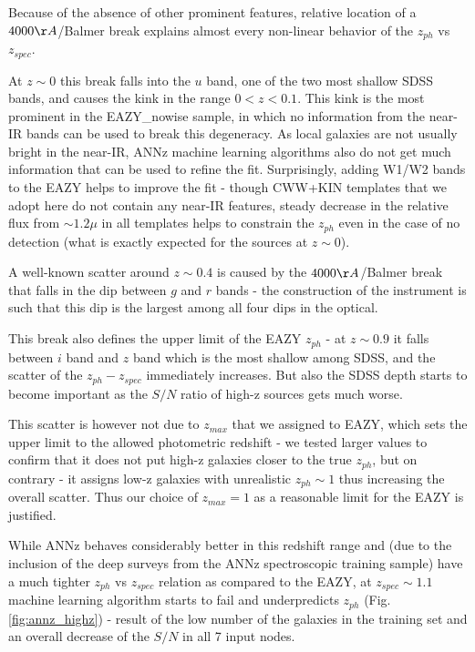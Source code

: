\documentclass[apj,iop]{emulateapj}
\begin{document}
Because of the absence of other prominent features, relative location of a $4000\AA$/Balmer break explains almost every non-linear behavior of the $z_{ph}$ vs $z_{spec}$. 

At $z\sim 0$ this break falls into the $u$ band, one of the two most shallow SDSS bands, and causes the kink in the range $0 < z < 0.1$. This kink is the most prominent in the EAZY\_nowise sample, in which no information from the near-IR bands can be used to break this degeneracy. As local galaxies are not usually bright in the near-IR, ANNz machine learning algorithms also do not get much information that can be used to refine the fit. Surprisingly, adding W1/W2 bands to the EAZY helps to improve the fit - though CWW+KIN templates that we adopt here do not contain any near-IR features, steady decrease in the relative flux from $\sim 1.2 \mu$ in all templates helps to constrain the $z_{ph}$ even in the case of no detection (what is exactly expected for the sources at $z\sim 0$).

A well-known scatter around $z\sim0.4$ is caused by the $4000\AA$/Balmer break that falls in the dip between $g$ and $r$ bands - the construction of the instrument is such that this dip is the largest among all four dips in the optical.


This break also defines the upper limit of the EAZY $z_{ph}$ - at $z\sim 0.9$ it falls between $i$ band and $z$ band which is the most shallow among SDSS, and the scatter of the $z_{ph}-z_{spec}$ immediately increases. But also the SDSS depth starts to become important as the $S/N$ ratio of high-z sources gets much worse. 

This scatter is however not due to $z_{max}$ that we assigned to EAZY, which sets the upper limit to the allowed photometric redshift - we tested larger values to confirm that it does not put high-z galaxies closer to the true $z_{ph}$, but on contrary - it assigns low-z galaxies with unrealistic $z_{ph}\sim 1$ thus increasing the overall scatter. Thus our choice of $z_{max}=1$ as a reasonable limit for the EAZY is justified.

While ANNz behaves considerably better in this redshift range and (due to the inclusion of the deep surveys from the ANNz spectroscopic training sample) have a much tighter $z_{ph}$ vs $z_{spec}$ relation as compared to the EAZY, at $z_{spec}\sim 1.1$ machine learning algorithm starts to fail and underpredicts $z_{ph}$ (Fig.\ref{fig:annz_highz}) - result of the low number of the galaxies in the training set and an overall decrease of the $S/N$ in all 7 input nodes. 
\end{document}
